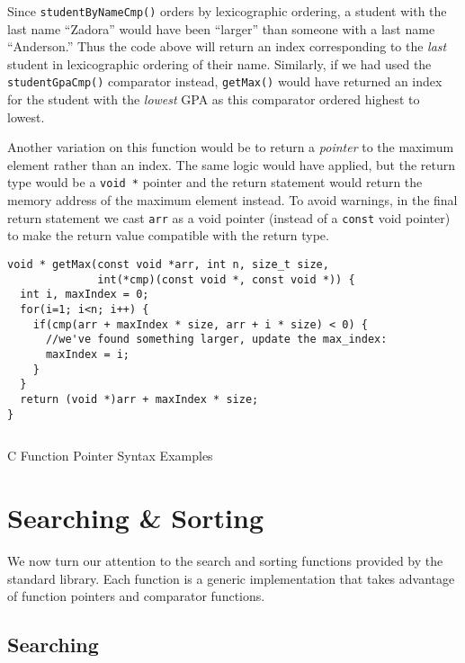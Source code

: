Since \texttt{studentByNameCmp()} orders by lexicographic ordering, 
a student with the last name ``Zadora'' would have been ``larger'' than 
someone with a last name ``Anderson.''  Thus the code above will return 
an index corresponding to the \emph{last} student in lexicographic ordering
of their name.  Similarly, if we had used the \texttt{studentGpaCmp()} comparator instead, \texttt{getMax()} would have returned an index for the
student with the \emph{lowest} GPA as this comparator ordered highest to
lowest.

Another variation on this function would be to return a \emph{pointer}
to the maximum element rather than an index.  The same logic would have
applied, but the return type would be a \texttt{void *} pointer
and the return statement would return the memory address of the maximum
element instead.  To avoid warnings, in the final return statement we
cast \texttt{arr} as a void pointer (instead of a 
\texttt{const} void pointer) to make the return value compatible
with the return type.

\begin{verbatim}
void * getMax(const void *arr, int n, size_t size, 
              int(*cmp)(const void *, const void *)) {
  int i, maxIndex = 0;
  for(i=1; i<n; i++) {
    if(cmp(arr + maxIndex * size, arr + i * size) < 0) {
      //we've found something larger, update the max_index:
      maxIndex = i;
    }
  }
  return (void *)arr + maxIndex * size;
}
\end{verbatim}

\begin{listing}[!h]
\inputminted[fontsize=\scriptsize]{c}{code/functionPointers.c}
\caption{C Function Pointer Syntax Examples}
\label{code:c:moreFunctionPointerSyntax}
\end{listing}

\section{Searching \& Sorting}

We now turn our attention to the search and sorting functions provided by
the standard library.  Each function is a generic implementation
that takes advantage of function pointers and comparator functions.

\subsection{Searching}

